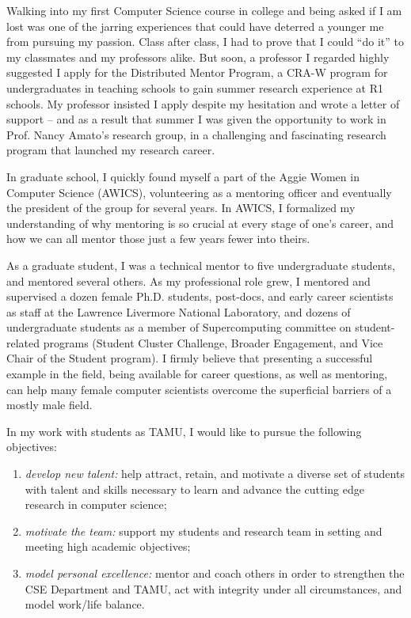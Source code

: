 \documentclass[10pt,letterpaper]{moderncv/moderncv}
\begin{document}
\date{January 20, 2021}
\opening{}
\makelettertitle%
\vspace{-.75cm}

Walking into my first Computer Science course in college and being asked if I am lost
was one of the jarring experiences that could have deterred a younger me from pursuing my passion.
Class after class, I had to prove that I could ``do it'' to my classmates and my professors alike.
But soon, a professor I regarded highly suggested I apply for the Distributed Mentor Program,
a CRA-W program for undergraduates in teaching schools to gain summer research experience at R1 schools.
My professor insisted I apply despite my hesitation and wrote a letter of support --
and as a result that summer I was given the opportunity to work in Prof. Nancy Amato's research group,
in a challenging and fascinating research program that launched my research career.

In graduate school, I quickly found myself a part of the Aggie Women in Computer Science (AWICS), volunteering as a mentoring officer
and eventually the president of the group for several years.  In AWICS, I formalized my understanding of why
mentoring is so crucial at every stage of one's career, and how we can all mentor those just a few years
fewer into theirs.

As a graduate student, I was a technical mentor to five undergraduate students, and mentored several others.
As my professional role grew, I mentored and supervised a dozen female Ph.D. students, post-docs,
and early career scientists as staff at the Lawrence Livermore National Laboratory, and dozens of undergraduate students as a member of
Supercomputing committee on student-related programs (Student Cluster Challenge, Broader Engagement,
and Vice Chair of the Student program).  I firmly believe that presenting a successful example in the field,
being available for career questions, as well as mentoring, can help many female computer scientists overcome the superficial barriers of a mostly male field.

In my work with students as TAMU, I would like to pursue the following objectives:
\begin{enumerate}
\item \emph{develop new talent:} help attract, retain, and motivate a diverse set of students with talent and skills necessary to learn and advance the cutting edge research in computer science;
\item \emph{motivate the team:} support my students and research team in setting and meeting high academic objectives;
\item \emph{model personal excellence:} mentor and coach others in order to strengthen the CSE Department and TAMU, act with integrity under all circumstances, and model work/life balance.
\end{enumerate}
\end{document}
